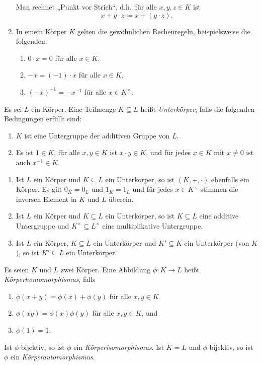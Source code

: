 \begin{bem}
\begin{enumerate}[leftmargin=*]
   Man rechnet „Punkt vor Strich“, d.h.\ für alle $x,y,z \in K$ ist
   \[
    x + y \cdot z \coloneqq x + (y \cdot z).
   \]
  \item
   In einem Körper $K$ gelten die gewöhnlichen Rechenregeln, beispielsweise die folgenden:
   \begin{enumerate}[label=\alph*)]
    \item $0 \cdot x = 0$ für alle $x \in K$.
    \item $-x = (-1) \cdot x$ für alle $x \in K$.
    \item $(-x)^{-1} = -x^{-1}$ für alle $x \in K^\times$.
   \end{enumerate}
 \end{enumerate}
\end{bem}


\begin{defi}
 Es sei $L$ ein Körper. Eine Teilmenge $K \subseteq L$ heißt \emph{Unterkörper}, falls die folgenden Bedingungen erfüllt sind:
 \begin{enumerate}[label=\roman*)]
  \item
   $K$ ist eine Untergruppe der additiven Gruppe von $L$.
  \item
   Es ist $1 \in K$, für alle $x,y \in K$ ist $x \cdot y \in K$, und für jedes $x \in K$ mit $x \neq 0$ ist auch $x^{-1} \in K$.
 \end{enumerate}
\end{defi}


\begin{bem}
 \begin{enumerate}[leftmargin=*]
  \item
   Ist $L$ ein Körper und $K \subseteq L$ ein Unterkörper, so ist $(K,+,\cdot)$ ebenfalls ein Körper. Es gilt $0_K = 0_L$ und $1_K = 1_L$ und für jedes $x \in K^\times$ stimmen die inversen Element in $K$ und $L$ überein.
  \item
   Ist $L$ ein Körper und $K \subseteq L$ ein Unterkörper, so ist $K \subseteq L$ eine additive Untergruppe und $K^\times \subseteq L^\times$ eine multiplikative Untergruppe.
  \item
   Ist $L$ ein Körper, $K \subseteq L$ ein Unterkörper und $K' \subseteq K$ ein Unterkörper (von $K$), so ist $K' \subseteq L$ ein Unterkörper.
 \end{enumerate}
\end{bem}


\begin{defi}
 Es seien $K$ und $L$ zwei Körper. Eine Abbildung $\phi \colon K \to L$ heißt \emph{Körperhomomorphismus}, falls
 \begin{enumerate}[label=\roman*)]
  \item
   $\phi(x+y) = \phi(x)+\phi(y)$ für alle $x,y \in K$
  \item
   $\phi(xy) = \phi(x)\phi(y)$ für alle $x,y \in K$, und
  \item
   $\phi(1) = 1$.
 \end{enumerate}
 Ist $\phi$ bijektiv, so ist $\phi$ ein \emph{Körperisomorphismus}. Ist $K = L$ und $\phi$ bijektiv, so ist $\phi$ ein \emph{Körperautomorphismus}.
\end{defi}


